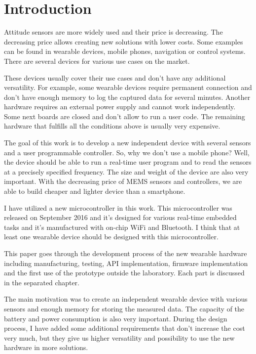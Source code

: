 \chapter{Introduction}
Attitude sensors are more widely used and their price is decreasing. The decreasing price allows creating new solutions with lower costs. Some examples can be found in wearable devices, mobile phones, navigation or control systems. There are several devices for various use cases on the market.

These devices usually cover their use cases and don't have any additional versatility. For example, some wearable devices require permanent connection and don't have enough memory to log the captured data for several minutes. Another hardware requires an external power supply and cannot work independently. Some next boards are closed and don't allow to run a user code. The remaining hardware that fulfills all the conditions above is usually very expensive.

The goal of this work is to develop a new independent device with several sensors and a user programmable controller. So, why we don't use a mobile phone? Well, the device should be able to run a real-time user program and to read the sensors at a precisely specified frequency. The size and weight of the device are also very important. With the decreasing price of \ac{MEMS} sensors and controllers, we are able to build cheaper and lighter device than a smartphone.

I have utilized a new microcontroller in this work. This microcontroller was released on September 2016 and it's designed for various real-time embedded tasks and it's manufactured with on-chip WiFi and Bluetooth. I think that at least one wearable device should be designed with this microcontroller.

This paper goes through the development process of the new wearable hardware including manufacturing, testing, API implementation, firmware implementation and the first use of the prototype outside the laboratory. Each part is discussed in the separated chapter.

The main motivation was to create an independent wearable device with various sensors and enough memory for storing the measured data. The capacity of the battery and power consumption is also very important. During the design process, I have added some additional requirements that don't increase the cost very much, but they give us higher versatility and possibility to use the new hardware in more solutions.

